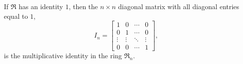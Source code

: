 If $\Re$ has an identity $1$, then the $n \times n$ diagonal matrix with all diagonal entries equal to $1$,
$$I_n = \begin{bmatrix}
1 & 0 & \cdots & 0 \\
0 & 1 & \cdots & 0 \\
\vdots & \vdots & \ddots & \vdots \\
0 & 0 & \cdots & 1
\end{bmatrix},$$
is the multiplicative identity in the ring $\Re_n$.
